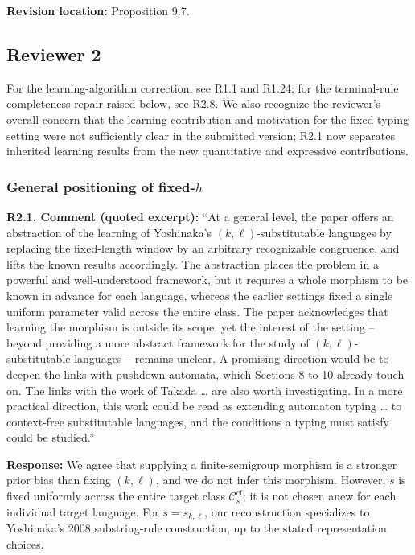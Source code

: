 \documentclass[
  10pt,
  a4paper,
]{article}
\begin{document}
\textbf{Revision location:} Proposition 9.7.


\subsection{Reviewer 2}\label{reviewer-2}

For the learning-algorithm correction, see R1.1 and R1.24; for the
terminal-rule completeness repair raised below, see R2.8.
We also recognize the reviewer's overall concern that the
learning contribution and motivation for the fixed-typing
setting were not sufficiently clear in the submitted version;
R2.1 now separates inherited learning results from the new
quantitative and expressive contributions.

\subsubsection{\texorpdfstring{General positioning of
fixed-\(h\)}{General positioning of fixed-h}}\label{general-positioning-of-fixed-h}

\textbf{R2.1. Comment (quoted excerpt):} ``At a general level, the paper
offers an abstraction of the learning of Yoshinaka's
\((k,\ell)\)-substitutable languages by replacing the fixed-length
window by an arbitrary recognizable congruence, and lifts the known
results accordingly. The abstraction places the problem in a powerful
and well-understood framework, but it requires a whole morphism to be
known in advance for each language, whereas the earlier settings fixed a
single uniform parameter valid across the entire class. The paper
acknowledges that learning the morphism is outside its scope, yet the
interest of the setting -- beyond providing a more abstract framework
for the study of \((k,\ell)\)-substitutable languages -- remains
unclear. A promising direction would be to deepen the links with
pushdown automata, which Sections 8 to 10 already touch on. The links
with the work of Takada \ldots{} are also worth investigating. In a more
practical direction, this work could be read as extending automaton
typing \ldots{} to context-free substitutable languages, and the
conditions a typing must satisfy could be studied.''

\textbf{Response:} We agree that supplying a finite-semigroup
morphism is a stronger prior bias than fixing $(k,\ell)$, and
we do not infer this morphism. However, $s$ is fixed uniformly
across the entire target class $\mathcal C_s^{\mathrm{cf}}$;
it is not chosen anew for each individual target language.
For $s=s_{k,\ell}$, our reconstruction specializes to
Yoshinaka's 2008 substring-rule construction, up to the stated
representation choices.
\end{document}
